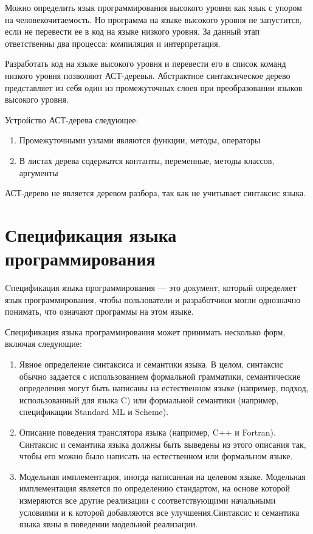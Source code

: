 \documentclass{mipt-thesis-bs}
\begin{document}
Можно определить язык программирования высокого уровня как язык с упором на человекочитаемость. Но
программа на языке высокого уровня не запустится, если не перевести ее в код на языке низкого уровня. За
данный этап ответственны два процесса: компиляция и интерпретация.

Разработать код на языке высокого уровня и перевести его в список команд низкого уровня позволяют АСТ-деревья.
Абстрактное синтаксическое дерево представляет из себя один из промежуточных слоев при преобразовании языков
высокого уровня.

Устройство АСТ-дерева следующее:

\begin{enumerate}
    \item Промежуточными узлами являются функции, методы, операторы
    \item В листах дерева содержатся контанты, переменные, методы классов, аргументы
\end{enumerate}

АСТ-дерево не является деревом разбора, так как не учитывает синтаксис языка.

\section{Спецификация языка программирования}

Cпецификация языка программирования — это документ, который определяет язык программирования, 
чтобы пользователи и разработчики могли однозначно понимать, что означают программы на этом языке.

Спецификация языка программирования может принимать несколько форм, включая следующие:

\begin{enumerate}
    \item Явное определение синтаксиса и семантики языка. В целом, синтаксис обычно 
    задается с использованием формальной грамматики, семантические определения 
    могут быть написаны на естественном языке (например, подход, использованный 
    для языка C) или формальной семантики (например, спецификации Standard ML и Scheme).
    \item Описание поведения транслятора языка (например, C++ и Fortran). 
    Синтаксис и семантика языка должны быть выведены из этого описания так, 
    чтобы его можно было написать на естественном или формальном языке.
    \item Модельная имплементация, иногда написанная на целевом языке. Модельная имплементация
    является по определению стандартом, на основе которой измеряются все другие реализации с 
    соответствующими начальными условиями и к которой добавляются все улучшения.Синтаксис 
    и семантика языка явны в поведении модельной реализации. 
\end{enumerate}
\end{document}
